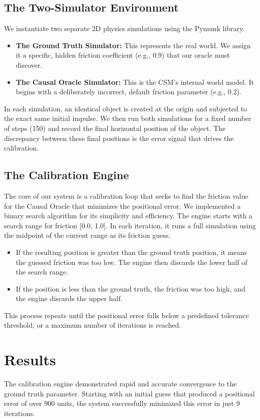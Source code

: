 \documentclass{article}
\begin{document}
\subsection{The Two-Simulator Environment}
We instantiate two separate 2D physics simulations using the Pymunk library.
\begin{itemize}
\item \textbf{The Ground Truth Simulator:} This represents the real world. We assign it a specific, hidden friction coefficient (e.g., 0.9) that our oracle must discover.
\item \textbf{The Causal Oracle Simulator:} This is the CSM's internal world model. It begins with a deliberately incorrect, default friction parameter (e.g., 0.2).
\end{itemize}
In each simulation, an identical object is created at the origin and subjected to the exact same initial impulse. We then run both simulations for a fixed number of steps (150) and record the final horizontal position of the object. The discrepancy between these final positions is the error signal that drives the calibration.

\subsection{The Calibration Engine}
The core of our system is a calibration loop that seeks to find the friction value for the Causal Oracle that minimizes the positional error. We implemented a binary search algorithm for its simplicity and efficiency. The engine starts with a search range for friction [0.0, 1.0]. In each iteration, it runs a full simulation using the midpoint of the current range as its friction guess.
\begin{itemize}
\item If the resulting position is greater than the ground truth position, it means the guessed friction was too low. The engine then discards the lower half of the search range.
\item If the position is less than the ground truth, the friction was too high, and the engine discards the upper half.
\end{itemize}
This process repeats until the positional error falls below a predefined tolerance threshold, or a maximum number of iterations is reached.

\section{Results}
The calibration engine demonstrated rapid and accurate convergence to the ground truth parameter. Starting with an initial guess that produced a positional error of over 900 units, the system successfully minimized this error in just 9 iterations.
\end{document}
